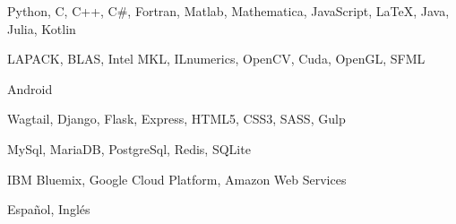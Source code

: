 
\begin{cvskills}

  \cvskill
    {
    } %
    {Python, C, C++, C\#, Fortran, Matlab, Mathematica, JavaScript, LaTeX, Java, Julia, Kotlin} %

  \cvskill
  {
  } %
  {LAPACK, BLAS, Intel MKL, ILnumerics, OpenCV, Cuda, OpenGL, SFML} %

  \cvskill
    {
    } %
    {Android} %

  \cvskill
    {
    } %
    {Wagtail, Django, Flask, Express, HTML5, CSS3, SASS, Gulp} %

  \cvskill
    {
    } %
    {MySql, MariaDB, PostgreSql, Redis, SQLite} %

  \cvskill
    {
    } %
    {IBM Bluemix, Google Cloud Platform, Amazon Web Services} %

  \cvskill
  {
  } %
  {Español, Inglés} %

\end{cvskills}
